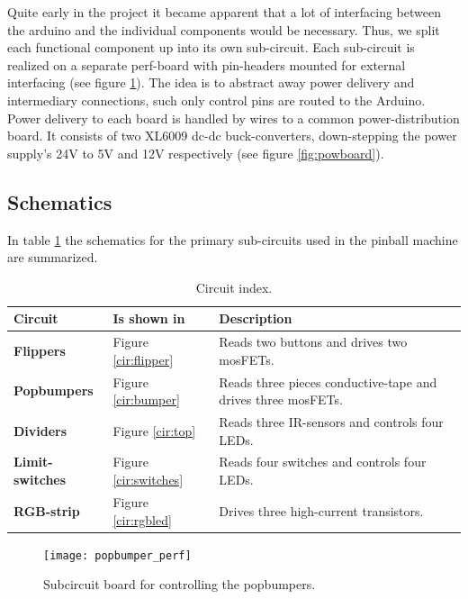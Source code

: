Quite early in the project it became apparent that a lot of interfacing between the arduino and the individual components would be necessary. 
Thus, we split each functional component up into its own sub-circuit. 
Each sub-circuit is realized on a separate perf-board with pin-headers mounted for external interfacing (see figure \ref{fig:perfboard}). 
The idea is to abstract away power delivery and intermediary connections, such only control pins are routed to the Arduino. 
Power delivery to each board is handled by wires to a common power-distribution board. 
It consists of two XL6009 dc-dc buck-converters, down-stepping the power supply's 24V to 5V and 12V respectively (see figure \ref{fig:powboard}).

\subsection{Schematics}
In table \ref{tab:circuits} the schematics for the primary sub-circuits used in the pinball machine are summarized.

\begin{table}[h]
	\centering
	\begin{tabular}{@{}lll@{}}
		\toprule
		Circuit & Is shown in & Description \\ \midrule
		\textbf{Flippers}       & Figure  \ref{cir:flipper}  & Reads two buttons and drives two mosFETs.                    \\ 
		\textbf{Popbumpers}     & Figure  \ref{cir:bumper}   & Reads three pieces conductive-tape and drives three mosFETs. \\
		\textbf{Dividers}       & Figure  \ref{cir:top}      & Reads three IR-sensors and controls four LEDs.               \\
		\textbf{Limit-switches} & Figure  \ref{cir:switches} & Reads four switches and controls four LEDs.                  \\
		\textbf{RGB-strip}      & Figure  \ref{cir:rgbled}   & Drives three high-current transistors.                       \\ \bottomrule
	\end{tabular}
	\caption{Circuit index.}
	\label{tab:circuits}
\end{table}

\begin{figure}[h]
	\centering
	\texttt{[image: popbumper\_perf]}
	\caption{Subcircuit board for controlling the popbumpers.}
	\label{fig:perfboard}
\end{figure}

